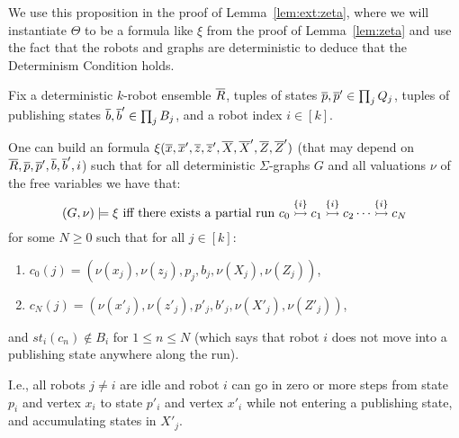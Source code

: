 We use this proposition in the proof of Lemma~\ref{lem:ext:zeta}, where we will instantiate $\Theta$ to be a formula
like $\xi$ from the proof of Lemma~\ref{lem:zeta} and use the fact that the robots and graphs are deterministic to deduce that the Determinism Condition holds.

\begin{lemma} \label{lem:ext:zeta}
Fix a deterministic $k$-robot ensemble $\tup{R}$, tuples of states $\tup{p},\tup{p}' \in \prod_j Q_j$, tuples of publishing states
$\tup{b},\tup{b}' \in \prod_j B_j$, and a robot index $i \in [k]$.

One can build an \msol formula $\xi(\tup{x},\tup{x}',\tup{z},\tup{z}',\tup{X},\tup{X}',\tup{Z},\tup{Z}')$ (that may depend on $\tup{R}, \tup{p}, \tup{p}', \tup{b}, \tup{b}', i$) such that for all deterministic $\Sigma$-graphs $G$ and all valuations $\nu$ of the free variables we have that:
\[
 (G,\nu) \models \xi \mbox{ iff there exists a partial run
$\onestep{c_0}{c_1}{\{i\}}\onestep{}{c_2}{\{i\}} \cdots \onestep{}{c_N}{\{i\}}$}
\]
for some $N \geq 0$ such that for all $j \in [k]$:
 \begin{enumerate}
 \item $c_0(j) = 	(\nu(x_j),	\nu(z_j),		p_j,		b_j,\nu(X_j),\nu(Z_j))$,
 \item $c_N(j) =	(\nu(x'_j),	\nu(z'_j),	p'_j,	b'_j, \nu(X'_j),\nu(Z'_j))$,
 \end{enumerate}
 and
 $st_i(c_n) \not \in B_i$ for $1 \leq n \leq N$ (which says that robot $i$ does not move into a publishing state anywhere along the run).

I.e., all robots $j \neq i$ are idle and robot $i$ can go in zero or more steps from state $p_i$ and vertex $x_i$ to state $p'_i$ and vertex $x'_i$ while not entering a publishing state, and accumulating states in $X'_j$.
\end{lemma}


